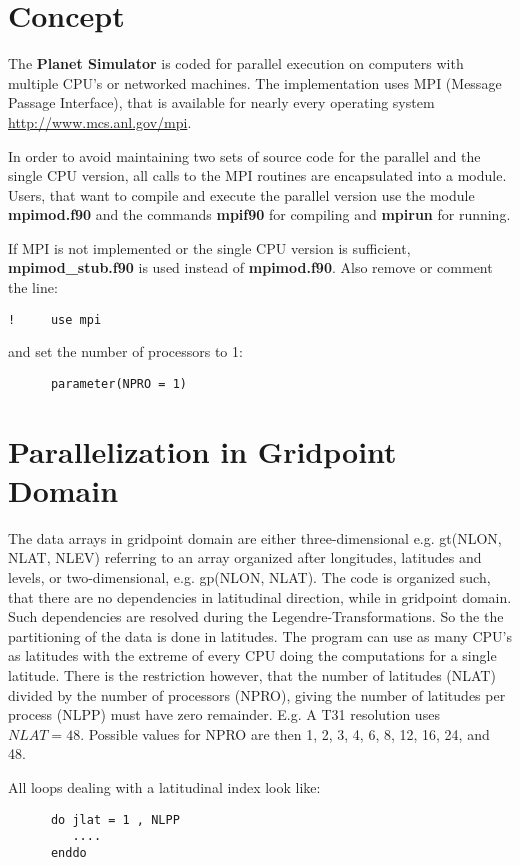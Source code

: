 \section{Concept}

The {\bf Planet Simulator} is coded for parallel execution
on computers with multiple CPU's or networked machines.
The implementation uses MPI (Message Passage Interface),
that is available for nearly every operating system
{\url{http://www.mcs.anl.gov/mpi}}.

In order to avoid maintaining two sets of source code
for the parallel and the single CPU version, all
calls to the MPI routines are encapsulated into a module.
Users, that want to compile and execute the parallel
version use the module
{\bf mpimod.f90} and the commands {\bf mpif90}
for compiling and {\bf mpirun} for running.

If MPI is not implemented or the single CPU
version is sufficient, {\bf mpimod\_stub.f90}
is used instead of {\bf mpimod.f90}.
Also remove or comment the line:
\begin{verbatim}
!     use mpi
\end{verbatim}
and set the number of processors to 1:
\begin{verbatim}
      parameter(NPRO = 1)
\end{verbatim}




\section{Parallelization in Gridpoint Domain}

The data arrays in gridpoint domain are either 
three-dimensional e.g. gt(NLON, NLAT, NLEV) referring
to an array organized after longitudes, latitudes and levels,
or two-dimensional, e.g. gp(NLON, NLAT).
The code is organized such, that there are no dependencies
in latitudinal direction, while in gridpoint domain.
Such dependencies are resolved during the Legendre-Transformations.
So the the partitioning of the data is done in latitudes.
The program can use as many CPU's as latitudes with the extreme
of every CPU doing the computations for a single latitude.
There is the restriction however, that the number of latitudes
(NLAT) divided by the number of processors (NPRO), giving
the number of latitudes per process (NLPP) must have zero
remainder. E.g. A T31 resolution uses $NLAT=48$.
Possible values for NPRO are then 1, 2, 3, 4, 6, 8, 12, 16, 24, and 48.

All loops dealing with a latitudinal index look like:
\begin{verbatim}
      do jlat = 1 , NLPP
         ....
      enddo
\end{verbatim}

